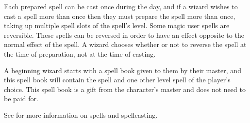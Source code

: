 \begin{multicols*}{2}
Each prepared spell can be cast once during the day, and if a wizard wishes to cast a spell more than once then they must prepare the spell more than once, taking up multiple spell slots of the spell’s level. Some magic user spells are reversible. These spells can be reversed in order to have an effect opposite to the normal effect of the spell. A wizard chooses whether or not to reverse the spell at the time of preparation, not at the time of casting.

A beginning wizard starts with a spell book given to them by their master, and this spell book will contain the spell  and one other  level spell of the player’s choice. This spell book is a gift from the character’s master and does not need to be paid for.

See  for more information on spells and spellcasting.


\end{multicols*}
